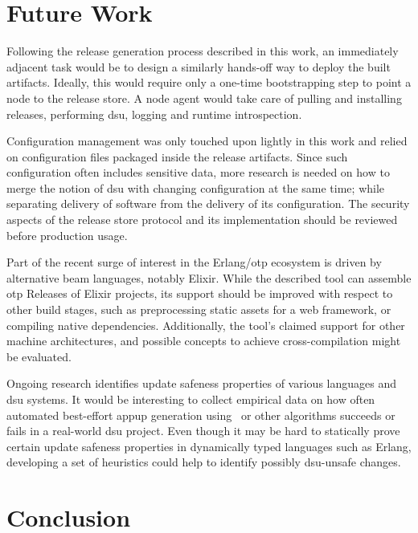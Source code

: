 \cleardoublepage
\section{Future Work}

Following the release generation process described in this work, an immediately adjacent task would be to design a similarly hands-off way to deploy the built artifacts. Ideally, this would require only a one-time bootstrapping step to point a node to the release store. A node agent would take care of pulling and installing releases, performing \acrshort{dsu}, logging and runtime introspection.

Configuration management was only touched upon lightly in this work and relied on configuration files packaged inside the release artifacts. Since such configuration often includes sensitive data, more research is needed on how to merge the notion of \acrshort{dsu} with changing configuration at the same time; while separating delivery of software from the delivery of its configuration. The security aspects of the release store protocol and its implementation should be reviewed before production usage.

Part of the recent surge of interest in the Erlang/\acrshort{otp} ecosystem is driven by alternative \acrshort{beam} languages, notably Elixir. While the described tool can assemble \acrshort{otp} Releases of Elixir projects, its support should be improved with respect to other build stages, such as preprocessing static assets for a web framework, or compiling native dependencies. Additionally, the tool's claimed support for other machine architectures, and possible concepts to achieve cross-compilation might be evaluated.

Ongoing research identifies update safeness properties of various languages and \acrshort{dsu} systems. It would be interesting to collect empirical data on how often automated best-effort \acrshort{appup} generation using~\cite{rebar3appup} or other algorithms succeeds or fails in a real-world \acrshort{dsu} project. Even though it may be hard to statically prove certain update safeness properties in dynamically typed languages such as Erlang, developing a set of heuristics could help to identify possibly \acrshort{dsu}-unsafe changes.

\cleardoublepage
\section{Conclusion}

